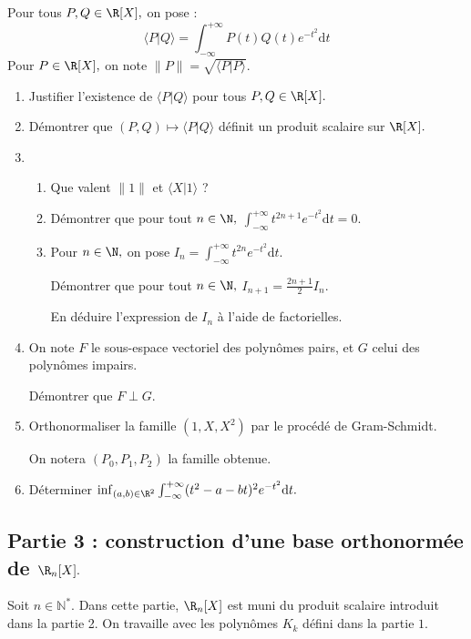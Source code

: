 \documentclass[twoside,french,11pt]{VcCours}
\newcommand{\dt}{\text{d}t}
\begin{document}
Pour tous $P,Q\in\R[X],$ on pose :
$$\langle P|Q\rangle=\int_{-\infty}^{+\infty}P(t)Q(t)e^{-t^2}\dt$$
Pour $P\in\R[X],$ on note $\|P\|=\sqrt{\langle P|P\rangle }.$
\begin{enumerate}
	\item Justifier l'existence de $\langle P|Q\rangle $ pour tous $P,Q\in\R[X].$
	\item Démontrer que $(P,Q)\longmapsto \langle P|Q\rangle $ définit un produit scalaire sur $\R[X].$
	\item
	\begin{enumerate}
		\item Que valent $\|1\|$ et $\langle X| 1\rangle $ ?
		\item Démontrer que pour tout $n\in\N,$ $\int_{-\infty}^{+\infty}t^{2n+1}e^{-t^2}\dt=0.$
		\item Pour $n\in\N,$ on pose $I_n=\int_{-\infty}^{+\infty}t^{2n}e^{-t^2}\dt.$

		Démontrer que pour tout $n\in\N,$ $I_{n+1}=\frac{2n+1}{2}I_n.$
		
		En déduire l'expression de $I_n$ à l'aide de factorielles.
\end{enumerate}
	\item On note $F$ le sous-espace vectoriel des polynômes pairs, et $G$ celui des polynômes impairs.

	Démontrer que $F\perp G.$
	\item Orthonormaliser la famille $(1,X,X^2)$ par le procédé de Gram-Schmidt.
	
	On notera $(P_0, P_1, P_2)$ la famille obtenue.
	\item Déterminer $\inf_{(a,b)\in\R^2}\int_{-\infty}^{+\infty}(t^2-a-bt)^2e^{-t^2} \dt.$
\end{enumerate}
 
\subsection*{Partie 3 : construction d'une base orthonormée de $\R_n[X].$}

Soit $n \in \mathbb{N}^*$. Dans cette partie, $\R_n[X]$ est muni du produit scalaire introduit dans la partie 2. On travaille avec les polynômes $K_k$ défini dans la partie $1.$ 
\end{document}
